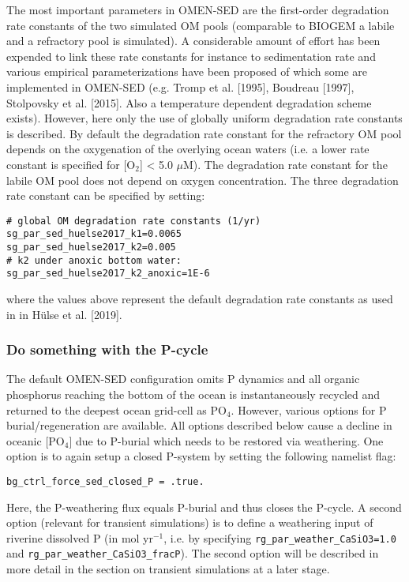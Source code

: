 The most important parameters in OMEN-SED are the first-order degradation rate constants of the two simulated OM pools (comparable to BIOGEM a labile and a refractory pool is simulated). A considerable amount of effort has been expended to link these rate
constants for instance to sedimentation rate and various empirical parameterizations have been proposed of which some are implemented in OMEN-SED (e.g. Tromp et al. [1995], Boudreau [1997], Stolpovsky et al. [2015]. Also a temperature dependent
degradation scheme exists). However, here only the use of globally uniform degradation rate constants is described. By default the degradation rate constant for the refractory OM pool depends on the oxygenation of the overlying ocean waters
(i.e. a lower rate constant is specified for [O$_2$] < 5.0 $\mu$M). The degradation rate constant for the labile OM pool does not depend on oxygen concentration. The three degradation rate constant can be specified by setting:
\vspace{-1mm}\begin{verbatim}
# global OM degradation rate constants (1/yr)
sg_par_sed_huelse2017_k1=0.0065
sg_par_sed_huelse2017_k2=0.005
# k2 under anoxic bottom water:
sg_par_sed_huelse2017_k2_anoxic=1E-6
\end{verbatim}\vspace{-1mm}
where the values above represent the default degradation rate constants as used in in H\"ulse et al. [2019].

%
\subsubsection*{Do something with the P-cycle}

The default OMEN-SED configuration omits P dynamics and all organic phosphorus reaching the bottom of the ocean is instantaneously recycled and returned to the deepest ocean grid-cell as PO$_4$.
However, various options for P burial/regeneration are available. All options described below cause a decline in oceanic [PO$_4$] due to P-burial which needs to be restored via weathering. One option is to again setup a closed P-system by setting the following namelist flag:
\vspace{-1mm}\begin{verbatim}
bg_ctrl_force_sed_closed_P = .true.
\end{verbatim}\vspace{-1mm}
Here, the P-weathering flux equals P-burial and thus closes the P-cycle. A second option (relevant for transient simulations) is to define a weathering input of riverine dissolved P (in mol yr$^{-1}$, i.e. by specifying
\texttt{rg\_par\_weather\_CaSiO3=1.0} and \texttt{rg\_par\_weather\_CaSiO3\_fracP}). The second option will be described in more detail in the section on transient simulations at a later stage.

